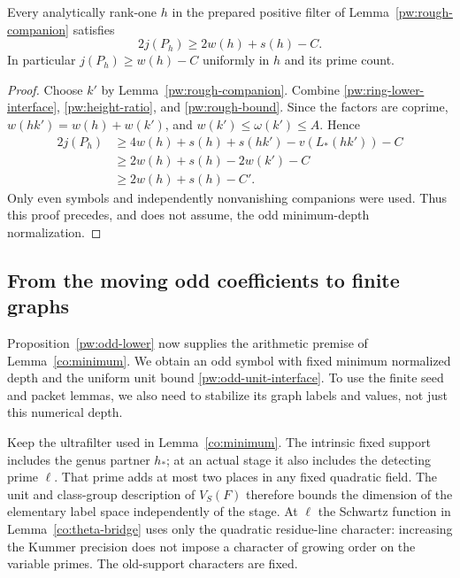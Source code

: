 \begin{proposition}
\label{pw:odd-lower}
Every analytically rank-one $h$ in the prepared positive filter of
Lemma~\ref{pw:rough-companion} satisfies
\begin{equation}\label{pw:odd-lower-bound}
 2j(P_h)\ge 2w(h)+s(h)-C.
\end{equation}
In particular $j(P_h)\ge w(h)-C$ uniformly in $h$ and its prime count.
\end{proposition}

\begin{proof}
Choose $k'$ by Lemma~\ref{pw:rough-companion}.  Combine
\eqref{pw:ring-lower-interface}, \eqref{pw:height-ratio}, and
\eqref{pw:rough-bound}.  Since the factors are coprime,
$w(hk')=w(h)+w(k')$, and $w(k')\le\omega(k')\le A$.  Hence
\begin{align*}
 2j(P_h)
 &\ge 4w(h)+s(h)+s(hk')-v(L_*(hk'))-C\\
 &\ge 2w(h)+s(h)-2w(k')-C\\
 &\ge 2w(h)+s(h)-C'.
\end{align*}
Only even symbols and independently nonvanishing companions were used.
Thus this proof precedes, and does not assume, the odd minimum-depth
normalization.
\end{proof}

\subsection{From the moving odd coefficients to finite graphs}
\label{pw:odd-stages}

Proposition~\ref{pw:odd-lower} now supplies the arithmetic premise of
Lemma~\ref{co:minimum}.  We obtain an odd symbol with fixed minimum
normalized depth and the uniform unit bound
\eqref{pw:odd-unit-interface}.  To use the finite seed and packet lemmas,
we also need to stabilize its graph labels and values, not just this
numerical depth.

Keep the ultrafilter used in Lemma~\ref{co:minimum}.  The intrinsic fixed
support includes the genus partner $h_*$; at an actual stage it also
includes the detecting prime $\ell$.  That prime adds at most two places
in any fixed quadratic field.  The unit and class-group description of
$V_S(F)$ therefore bounds the dimension of the elementary label space
independently of the stage.  At $\ell$ the Schwartz function in
Lemma~\ref{co:theta-bridge} uses only the quadratic residue-line character:
increasing the Kummer precision does not impose a character of growing
order on the variable primes.  The old-support characters are fixed.


